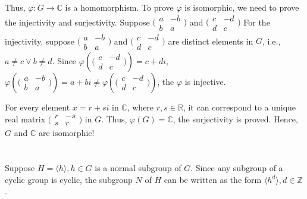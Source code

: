 \documentclass[12pt]{article}
\begin{document}
Thus, $\varphi:G\rightarrow \mathbb{C}$ is a homomorphism. To prove $\varphi$ is isomorphic, we need to prove the injectivity and surjectivity.
Suppose $\big(\begin{smallmatrix} a & -b\\b & a\end{smallmatrix}\big)$ and $\big(\begin{smallmatrix} c & -d\\d & c\end{smallmatrix}\big)$
For the injectivity, suppose $\big(\begin{smallmatrix} a & -b\\b & a\end{smallmatrix}\big)$ and $\big(\begin{smallmatrix} c & -d\\d & c\end{smallmatrix}\big)$ are distinct elements in $G$, i.e., $a\ne c\vee b\ne d$. Since $\varphi(\big(\begin{smallmatrix} c & -d\\d & c\end{smallmatrix}\big))=c+di$, $\varphi(\big(\begin{smallmatrix} a & -b\\b & a\end{smallmatrix}\big))=a+bi\ne\varphi(\big(\begin{smallmatrix} c & -d\\d & c\end{smallmatrix}\big))$, the $\varphi$ is injective.

For every element $x=r+si$ in $\mathbb{C}$, where $r,s\in\mathbb{R}$, it can correspond to a unique real matrix $\big(\begin{smallmatrix} r& -s\\s & r\end{smallmatrix}\big)$ in $G$. Thus, $\varphi(G)=\mathbb{C}$, the surjectivity is proved. Hence, $G$ and $\mathbb{C}$ are isomorphic!

\newpage
\section{} %
\subsection{}
Suppose $H=\langle h\rangle,h\in G$ is a normal subgroup of $G$. Since any subgroup of a cyclic group is cyclic, the subgroup $N$ of $H$ can be written as the form $\langle h^d\rangle,d\in \mathbb{Z}$.
\end{document}
